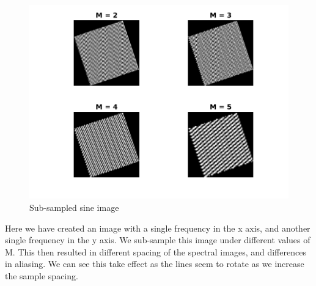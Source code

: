 \begin{figure}[H]
    \centering
    \includegraphics[scale=0.75]{sub_sample_sine.png}
    \caption{Sub-sampled sine image}
\end{figure}

Here we have created an image with a single frequency in the x axis, and another
single frequency in the y axis. We sub-sample this image under different values
of M. This then resulted in different spacing of the spectral images, and
differences in aliasing. We can see this take effect as the lines seem to
rotate as we increase the sample spacing.
